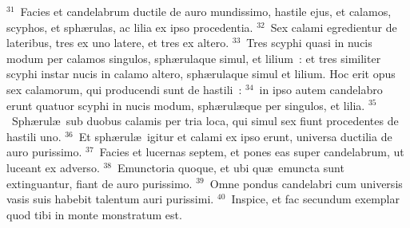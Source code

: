 ${}^{31}$~Facies et candelabrum ductile de auro mundissimo, hastile ejus, et calamos, scyphos, et sph\ae rulas, ac lilia ex ipso procedentia.
${}^{32}$~Sex calami egredientur de lateribus, tres ex uno latere, et tres ex altero.
${}^{33}$~Tres scyphi quasi in nucis modum per calamos singulos, sph\ae rulaque simul, et lilium~: et tres similiter scyphi instar nucis in calamo altero, sph\ae rulaque simul et lilium. Hoc erit opus sex calamorum, qui producendi sunt de hastili~:
${}^{34}$~in ipso autem candelabro erunt quatuor scyphi in nucis modum, sph\ae rul\ae que per singulos, et lilia.
${}^{35}$~Sph\ae rul\ae\ sub duobus calamis per tria loca, qui simul sex fiunt procedentes de hastili uno.
${}^{36}$~Et sph\ae rul\ae\ igitur et calami ex ipso erunt, universa ductilia de auro purissimo.
${}^{37}$~Facies et lucernas septem, et pones eas super candelabrum, ut luceant ex adverso.
${}^{38}$~Emunctoria quoque, et ubi qu\ae\ emuncta sunt extinguantur, fiant de auro purissimo.
${}^{39}$~Omne pondus candelabri cum universis vasis suis habebit talentum auri purissimi.
${}^{40}$~Inspice, et fac secundum exemplar quod tibi in monte monstratum est.

